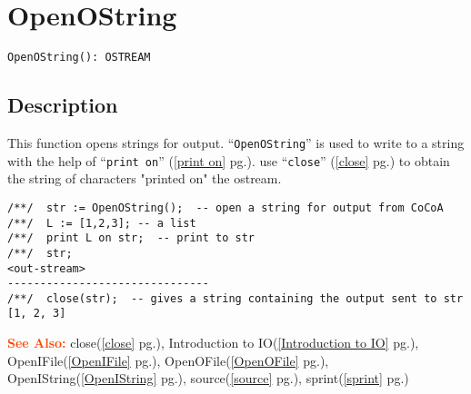 \documentclass[a4paper]{mybook}
\newenvironment{command}{}{} %
\newcommand\SeeAlso{\par\textcolor{OrangeRed}{\textbf{\large See Also: }}}
\begin{document}
\section{OpenOString}
\label{OpenOString}
\begin{command} %


\begin{Verbatim}[label=syntax, rulecolor=\color{MidnightBlue},
frame=single]
OpenOString(): OSTREAM
\end{Verbatim}


\subsection*{Description}

This function opens strings for output.  ``\verb&OpenOString&'' is used to write to a
string with the help of ``\verb&print on&'' (\ref{print on} pg.\pageref{print on}).  use ``\verb&close&'' (\ref{close} pg.\pageref{close}) to obtain
the string of characters "printed on" the ostream.
\begin{Verbatim}[label=example, rulecolor=\color{PineGreen}, frame=single]
/**/  str := OpenOString();  -- open a string for output from CoCoA
/**/  L := [1,2,3]; -- a list
/**/  print L on str;  -- print to str
/**/  str;
<out-stream>
-------------------------------
/**/  close(str);  -- gives a string containing the output sent to str
[1, 2, 3]
\end{Verbatim}


\SeeAlso %
  close(\ref{close} pg.\pageref{close}), 
    Introduction to IO(\ref{Introduction to IO} pg.\pageref{Introduction to IO}), 
    OpenIFile(\ref{OpenIFile} pg.\pageref{OpenIFile}), 
    OpenOFile(\ref{OpenOFile} pg.\pageref{OpenOFile}), 
    OpenIString(\ref{OpenIString} pg.\pageref{OpenIString}), 
    source(\ref{source} pg.\pageref{source}), 
    sprint(\ref{sprint} pg.\pageref{sprint})
\end{command} %
\end{document}
